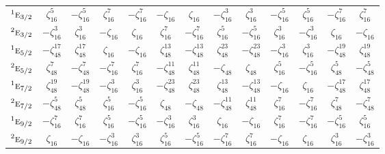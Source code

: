 \documentclass[10pt,a4paper]{article}
\numberwithin{equation}{section}
\newcommand{\irr}[1]{\text{\normalfont\scshape #1}}
\newcommand{\conjpair}[1]{{}^{#1}}
\newcommand{\rootunity}[1]{\zeta_{#1}}
\begin{document}
{\begin{longtable}{@{}lcccccccccccc@{}}
$\conjpair{1}\irr{e}_{3/2}$ & $\rootunity{16}^{5}$ & $-\rootunity{16}^{5}$ & $\rootunity{16}^{7}$ & $-\rootunity{16}^{7}$ & $-\rootunity{16}$ & $\rootunity{16}$ & $-\rootunity{16}^{3}$ & $\rootunity{16}^{3}$ & $-\rootunity{16}^{5}$ & $\rootunity{16}^{5}$ & $-\rootunity{16}^{7}$ & $\rootunity{16}^{7}$\\
$\conjpair{2}\irr{e}_{3/2}$ & $-\rootunity{16}^{3}$ & $\rootunity{16}^{3}$ & $-\rootunity{16}$ & $\rootunity{16}$ & $\rootunity{16}^{7}$ & $-\rootunity{16}^{7}$ & $\rootunity{16}^{5}$ & $-\rootunity{16}^{5}$ & $\rootunity{16}^{3}$ & $-\rootunity{16}^{3}$ & $\rootunity{16}$ & $-\rootunity{16}$\\
$\conjpair{1}\irr{e}_{5/2}$ & $-\rootunity{48}^{17}$ & $\rootunity{48}^{17}$ & $\rootunity{16}$ & $-\rootunity{16}$ & $\rootunity{48}^{13}$ & $-\rootunity{48}^{13}$ & $\rootunity{48}^{23}$ & $-\rootunity{48}^{23}$ & $-\rootunity{16}^{3}$ & $\rootunity{16}^{3}$ & $-\rootunity{48}^{19}$ & $\rootunity{48}^{19}$\\
$\conjpair{2}\irr{e}_{5/2}$ & $\rootunity{48}^{7}$ & $-\rootunity{48}^{7}$ & $-\rootunity{16}^{7}$ & $\rootunity{16}^{7}$ & $-\rootunity{48}^{11}$ & $\rootunity{48}^{11}$ & $-\rootunity{48}$ & $\rootunity{48}$ & $\rootunity{16}^{5}$ & $-\rootunity{16}^{5}$ & $\rootunity{48}^{5}$ & $-\rootunity{48}^{5}$\\
$\conjpair{1}\irr{e}_{7/2}$ & $\rootunity{48}^{19}$ & $-\rootunity{48}^{19}$ & $-\rootunity{16}^{3}$ & $\rootunity{16}^{3}$ & $-\rootunity{48}^{23}$ & $\rootunity{48}^{23}$ & $\rootunity{48}^{13}$ & $-\rootunity{48}^{13}$ & $-\rootunity{16}$ & $\rootunity{16}$ & $-\rootunity{48}^{17}$ & $\rootunity{48}^{17}$\\
$\conjpair{2}\irr{e}_{7/2}$ & $-\rootunity{48}^{5}$ & $\rootunity{48}^{5}$ & $\rootunity{16}^{5}$ & $-\rootunity{16}^{5}$ & $\rootunity{48}$ & $-\rootunity{48}$ & $-\rootunity{48}^{11}$ & $\rootunity{48}^{11}$ & $\rootunity{16}^{7}$ & $-\rootunity{16}^{7}$ & $\rootunity{48}^{7}$ & $-\rootunity{48}^{7}$\\
$\conjpair{1}\irr{e}_{9/2}$ & $-\rootunity{16}^{7}$ & $\rootunity{16}^{7}$ & $\rootunity{16}^{5}$ & $-\rootunity{16}^{5}$ & $-\rootunity{16}^{3}$ & $\rootunity{16}^{3}$ & $\rootunity{16}$ & $-\rootunity{16}$ & $\rootunity{16}^{7}$ & $-\rootunity{16}^{7}$ & $-\rootunity{16}^{5}$ & $\rootunity{16}^{5}$\\
$\conjpair{2}\irr{e}_{9/2}$ & $\rootunity{16}$ & $-\rootunity{16}$ & $-\rootunity{16}^{3}$ & $\rootunity{16}^{3}$ & $\rootunity{16}^{5}$ & $-\rootunity{16}^{5}$ & $-\rootunity{16}^{7}$ & $\rootunity{16}^{7}$ & $-\rootunity{16}$ & $\rootunity{16}$ & $\rootunity{16}^{3}$ & $-\rootunity{16}^{3}$\\

\end{longtable}}
\end{document}
